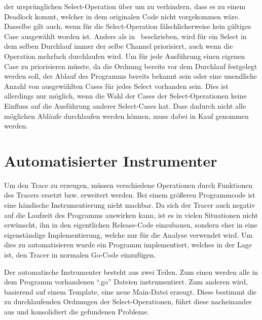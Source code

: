 der ursprünglichen Select-Operation über um zu verhindern, dass es zu einem 
Deadlock kommt, welcher in dem originalen Code nicht vorgekommen wäre.
Dasselbe gilt auch, wenn für die Select-Operation fälschlicherweise kein 
gültiges Case ausgewählt worden ist. Anders als in~\cite{gfuzz} beschrieben,
wird für ein Select in dem selben Durchlauf immer der selbe Channel priorisiert, 
auch wenn die Operation mehrfach durchlaufen wird. Um für jede Ausführung einen
eigenen Case zu priorisieren müsste, da die Ordnung bereits vor dem 
Durchlauf festgelegt werden soll, der Ablauf des Programms bereits 
bekannt sein oder eine unendliche Anzahl von ausgewählten Cases für jedes Select
vorhanden sein. Dies ist allerdings nur möglich, wenn die Wahl der Cases der 
Select-Operationen keine Einfluss auf die Ausführung anderer Select-Cases 
hat. Dass dadurch nicht alle möglichen Abläufe durchlaufen werden können, 
muss dabei in Kauf genommen werden.

\section{Automatisierter Instrumenter}\label{Chap:Instrumenter-Sec:Instrumenter}
Um den Trace zu erzeugen, müssen verschiedene Operationen durch Funktionen
des Tracers ersetzt bzw. erweitert werden. Bei einem größeren 
Programmcode ist eine händische Instrumentierung nicht machbar.
Da sich der Tracer auch negativ auf die Laufzeit des Programms 
auswirken kann, ist es in vielen Situationen nicht erwünscht, ihn in den 
eigentlichen Release-Code einzubauen, sondern eher in eine eigenständige 
Implementierung, welche nur für die Analyse verwendet wird. Um dies zu
automatisieren wurde ein Programm implementiert, welches in der 
Lage ist, den Tracer in normalen Go-Code einzufügen.

Der automatische Instrumenter besteht aus zwei Teilen. 
Zum einen werden alle 
in dem Programm vorhandenen ``.go'' Dateien instrumentiert. 
Zum anderen 
wird, basierend auf einem Template, eine neue Main-Datei erzeugt.
Diese bestimmt die zu durchlaufenden Ordnungen der Select-Operationen,
führt diese nacheinander aus und konsolidiert die gefundenen Probleme. 

